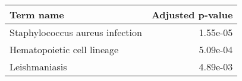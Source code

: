 \begin{tabular}{lr}
\toprule
                      Term name &  Adjusted p-value \\
\midrule
Staphylococcus aureus infection &          1.55e-05 \\
     Hematopoietic cell lineage &          5.09e-04 \\
                  Leishmaniasis &          4.89e-03 \\
\bottomrule
\end{tabular}

